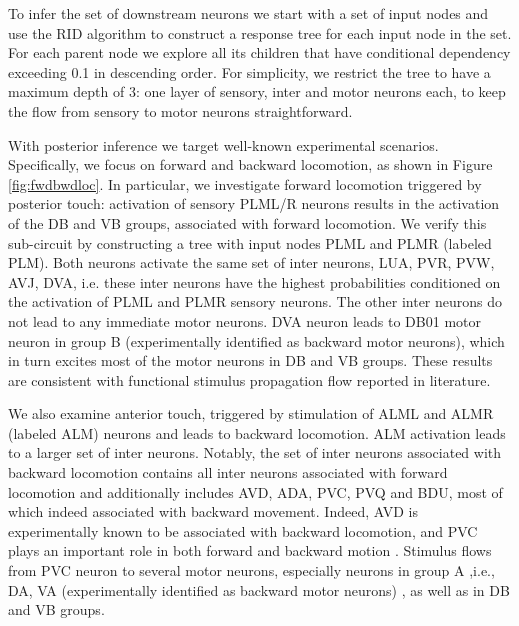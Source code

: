 \documentclass[letterpaper,11pt]{article}
\begin{document}
To infer the set of downstream neurons we start with a set of input nodes and use the RID algorithm to construct a response tree for each input node in the set. For each parent node we explore all its children that have conditional dependency exceeding 0.1 in descending order. For simplicity, we restrict the tree to have a maximum depth of 3: one layer of sensory, inter and motor neurons each, to keep the flow from sensory to motor neurons straightforward.

With posterior inference we target well-known experimental scenarios. Specifically, we focus on forward and backward locomotion, as shown in Figure \ref{fig:fwdbwdloc}. In particular, we investigate forward locomotion triggered by posterior touch: activation of sensory PLML/R neurons results in the activation of the DB and VB groups, associated with forward locomotion. We verify this sub-circuit by constructing a tree with input nodes PLML and PLMR (labeled PLM). Both neurons activate the same set of inter neurons, LUA, PVR, PVW, AVJ, DVA, i.e. these inter neurons have the highest probabilities conditioned on the activation of PLML and PLMR sensory neurons. The other inter neurons do not lead to any immediate motor neurons.  DVA neuron leads to DB01 motor neuron in group B (experimentally identified as backward motor neurons), which in turn excites most of the motor neurons in DB and VB groups. These results are consistent with functional stimulus propagation flow reported in literature.  

We also examine anterior touch, triggered by stimulation of ALML and ALMR (labeled ALM) neurons and leads to backward locomotion. ALM activation leads to a larger set of inter neurons. Notably, the set of inter neurons associated with backward locomotion contains all inter neurons associated with forward locomotion and additionally includes AVD, ADA, PVC, PVQ and BDU, most of which indeed associated with backward movement. Indeed, AVD is experimentally known to be associated with backward locomotion, and PVC  plays an important role in both forward and backward motion \cite{worm,dynamic1}. Stimulus flows from PVC neuron to several motor neurons, especially neurons in group A ,i.e., DA, VA (experimentally identified as backward motor neurons) , as well as in DB and VB groups. 
\end{document}
